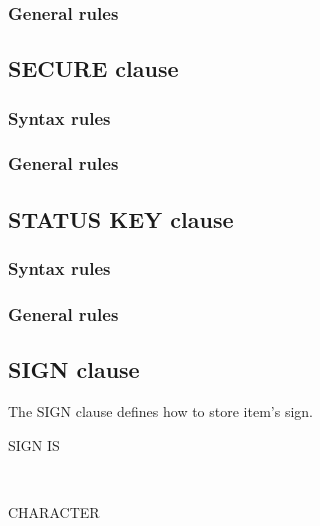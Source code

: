 \subsubsection{General rules}

\subsection{SECURE clause}

\begin{syntax}
\end{syntax}

\subsubsection{Syntax rules}

\subsubsection{General rules}

\subsection{STATUS KEY clause}

\begin{syntax}[\deletedcolour]
\end{syntax}

\subsubsection{Syntax rules}

\subsubsection{General rules}

\subsection{SIGN clause}

The SIGN clause defines how to store item's sign.

\begin{syntax}
  SIGN IS
  \begin{1=}
     \\
  \end{1=}
  \begin{0-1}
     CHARACTER
  \end{0-1}
\end{syntax}

